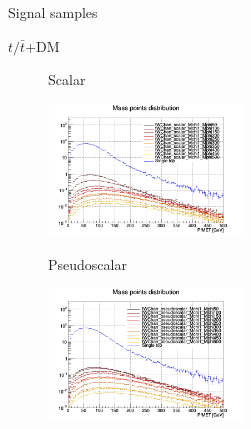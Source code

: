 \documentclass[8pt]{beamer}
\begin{document}
\begin{frame}{Signal samples}
\justifying
\begin{block}{\centering $t/\bar t$+DM}\end{block} \vspace{-10pt}
\begin{figure}[htbp]
\centering
\begin{minipage}[b]{.49\textwidth}
\vspace{-5pt}
\begin{block}{\centering Scalar}\end{block}
\begin{center}
\includegraphics[width=5.2cm, height=3.5cm]{figs/singleTopScalarMET.png}
\end{center}
\end{minipage}
\begin{minipage}[b]{.02\textwidth}\end{minipage}
\begin{minipage}[b]{.49\textwidth}
\vspace{-5pt}
\begin{block}{\centering Pseudoscalar}\end{block}
\begin{center}
\includegraphics[width=5.2cm, height=3.5cm]{figs/singleTopPseudoMET.png}
\end{center}
\end{minipage}
\end{figure} \vfill


\end{frame}
\end{document}
